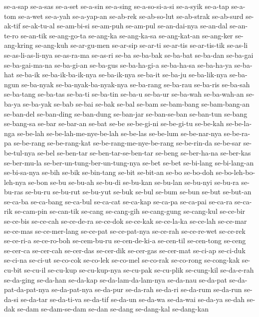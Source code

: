 {se-a-sap se-a-sas se-a-set se-a-sin se-a-sing se-a-so-si-a-si se-a-syik
se-a-tap se-a-tom se-a-wet se-a-yah se-a-yap-an se-ab-rek se-ab-so-lut
se-ab-strak se-ab-surd se-ak-tif se-ak-tu-al se-am-bi-si se-am-puh
se-am-pul se-an-dai-nya se-an-dal se-an-te-ro se-an-tik se-ang-go-ta
se-ang-ka se-ang-ka-sa se-ang-kat-an se-ang-ker se-ang-kring se-ang-kuh
se-ar-gu-men se-ar-sip se-ar-ti se-ar-tis se-ar-tis-tik se-as-li
se-as-li-as-li-nya se-as-ra-ma se-as-ri se-ba se-ba-bak se-ba-bat
se-ba-dan se-ba-gai se-ba-gai-ma-na se-ba-gi-an se-ba-gus se-ba-ha-gi-a
se-ba-ha-sa se-ba-ha-ya se-ba-hat se-ba-ik se-ba-ik-ba-ik-nya se-ba-ik-nya
se-ba-it se-ba-ju se-ba-lik-nya se-ba-ngun se-ba-nyak
se-ba-nyak-ba-nyak-nya se-ba-rang se-ba-rau se-ba-ris se-ba-sah se-ba-tang
se-ba-tas se-ba-ti se-ba-tin se-ba-u se-ba-ur se-ba-wah se-ba-wah-an
se-ba-ya se-ba-yak se-bab se-bai se-bak se-bal se-bam se-bam-bang
se-bam-bang-an se-ban-del se-ban-ding se-ban-dung se-ban-jar se-ban-se-ban
se-ban-tun se-bang se-bang-sa se-bar se-bar-an se-bat se-be se-be-gi-ni
se-be-gi-tu se-be-kah se-be-la-nga se-be-lah se-be-lah-me-nye-be-lah
se-be-las se-be-lum se-be-nar-nya se-be-ra-pa se-be-rang se-be-rang-kat
se-be-rang-me-nye-be-rang se-be-rin-da se-be-sar se-be-tul-nya se-bel
se-ben-tar se-ben-tar-se-ben-tar se-beng se-ber-ha-na se-ber-kas
se-ber-mu-la se-ber-un-tung-ber-un-tung-nya se-bet se-bet se-bi-lang
se-bi-lang-an se-bi-sa-nya se-bih se-bik se-bin-tang se-bit se-bit-an
se-bo se-bo-doh se-bo-leh-bo-leh-nya se-bon se-bu se-bu-ah se-bu-di
se-bu-kan se-bu-lan se-bu-nyi se-bu-ra se-bu-ras se-bu-ru se-bu-rut
se-bu-yut se-buk se-bul se-bum se-bun se-but se-but-an se-ca-ba se-ca-bang
se-ca-bul se-ca-cat se-ca-kap se-ca-pa se-ca-pai se-ca-ra se-ca-rik
se-cam-pin se-can-tik se-cang se-cang-gih se-cang-gung se-cang-kul
se-ce-bir se-ce-bis se-ce-cah se-ce-de-ra se-ce-dok se-ce-kak se-ce-la-ka
se-ce-lah se-ce-mar se-ce-mas se-ce-mer-lang se-ce-pat se-ce-pat-nya
se-ce-rah se-ce-re-wet se-ce-rek se-ce-ri-a se-ce-ro-boh se-cem-bu-ru
se-cen-de-ki-a se-cen-til se-cen-tong se-ceng se-cer-ca se-cer-cah
se-cer-das se-cer-dik se-cer-gas se-cer-mat se-ci-ap se-ci-duk se-ci-na
se-ci-ut se-co-cok se-co-lek se-co-mel se-co-rak se-co-rong se-cong-kak
se-cu-bit se-cu-il se-cu-kup se-cu-kup-nya se-cu-pak se-cu-plik
se-cung-kil se-da-e-rah se-da-ging se-da-han se-da-kap
se-da-lam-da-lam-nya se-da-nau se-da-pat se-da-pat-da-pat-nya
se-da-pat-nya se-da-pur se-da-rah se-da-ri se-da-rum se-da-run se-da-si
se-da-tar se-da-ti-va se-da-tif se-da-un se-da-wa se-da-wai se-da-ya
se-dah se-dak se-dam se-dam-se-dam se-dan se-dang se-dang-kal se-dang-kan
}
